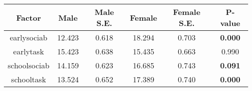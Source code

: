 \begin{longtable}{c c c c c c}
\toprule
\textbf{Factor} & \textbf{Male} & \textbf{Male S.E.}  & \textbf{Female} & \textbf{Female S.E.} & \textbf{P-value} \\
\midrule
earlysociab & 12.423 & 0.618 &  18.294 & 0.703 & \textbf{0.000} \\
earlytask & 15.423 & 0.638 &  15.435 & 0.663 & 0.990 \\
schoolsociab & 14.159 & 0.623 &  16.685 & 0.743 & \textbf{0.091} \\
schooltask & 13.524 & 0.652 &  17.389 & 0.740 & \textbf{0.000} \\
\bottomrule
\end{longtable}
